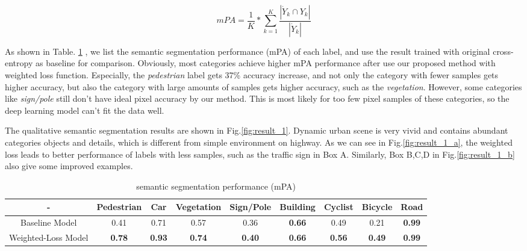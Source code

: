 	\begin{equation}
	mPA = \dfrac{1}{K}*\sum_{k=1}^{K}\dfrac{\left| \dot{Y}_k \cap Y_k \right|}{\left| \dot{Y}_k\right|}
	\end{equation}
	
	As shown in Table. \ref{performance} , we list the semantic segmentation performance (mPA) of each label, and use the result trained with original cross-entropy as baseline for comparison. Obviously, most categories achieve higher mPA performance after use our proposed method with weighted loss function. Especially, the \textit{pedestrian} label gets 37\% accuracy increase, and not only the category with fewer samples gets higher accuracy, but also the category with large amounts of samples gets higher accuracy, such as the \textit{vegetation}. However, some categories like \textit{sign/pole} still don't have ideal pixel accuracy by our method. This is most likely for too few pixel samples of these categories, so the deep learning model can't fit the data well.
	
	The qualitative semantic segmentation results are shown in Fig.\ref{fig:result_1}. Dynamic urban scene is very vivid and contains abundant categories objects and details, which is different from simple environment on highway. As we can see in Fig.\ref{fig:result_1_a}, the weighted loss leads to better performance of labels with less samples, such as the traffic sign in Box A. Similarly, Box B,C,D in Fig.\ref{fig:result_1_b} also give some improved examples.
	
	\begin{table}
		\caption{semantic segmentation performance (mPA)}
		\label{performance}
		\centering
		\small
		\renewcommand{\arraystretch}{1.5}
		\begin{tabular}{|c|c|c|c|c|c|c|c|c|}
			\hline
			- & Pedestrian & Car & Vegetation & Sign/Pole & Building & Cyclist & Bicycle & Road	\\
			\hline
			Baseline Model & 0.41 & 0.71 & 0.57 & 0.36 & \textbf{0.66} & 0.49 & 0.21 & \textbf{0.99}	\\
			\hline
			Weighted-Loss Model& \textbf{0.78} & \textbf{0.93} & \textbf{0.74} & \textbf{0.40} & \textbf{0.66} & \textbf{0.56} & \textbf{0.49} & \textbf{0.99}	\\
			\hline
		\end{tabular}
	\end{table}
	
